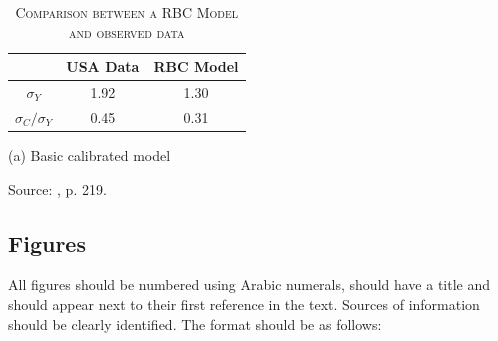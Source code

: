 \documentclass [12pt,a4paper,oneside]{article}
\begin{document}
\begin{table}[h] \label{table:1}
\centering
 \begin{threeparttable}
{\def\arraystretch{1}
\setlength{\tabcolsep}{30pt}


\caption{\textsc{Comparison between a RBC Model and observed data}}

\begin{tabular}{@{}ccc}

\hline\hline
& USA Data & RBC Model\tnote{(a)} \\ \hline

$\sigma_{Y}$ & 1.92 & 1.30 %
 \\ 
$\sigma_{C}/\sigma_{Y}$ & 0.45 & 0.31 %
 \\ \toprule

\end{tabular}%
 }

    \begin{tablenotes}
      \footnotesize
      \item[(a)] Basic calibrated model
      \item Source: \cite{romer_2012}, p. 219.
    \end{tablenotes}
  \end{threeparttable}
\end{table}%








	\subsection{Figures}

All figures should be numbered using Arabic numerals, should have a title and should appear next to their first reference in the text. Sources of information should be clearly identified. The format should be as follows:
\end{document}
